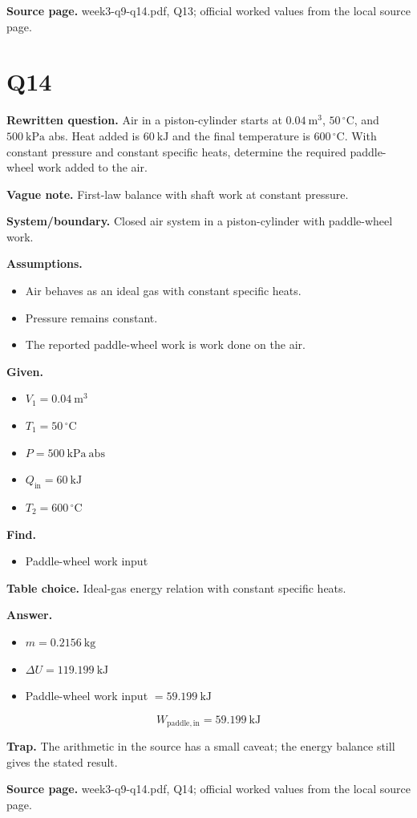 \textbf{Source page.} week3-q9-q14.pdf, Q13; official worked values from the local source page.

\section*{Q14}
\textbf{Rewritten question.} Air in a piston-cylinder starts at $0.04\ \mathrm{m^3}$, $50\,^{\circ}\mathrm{C}$, and $500\ \mathrm{kPa}$ abs. Heat added is $60\ \mathrm{kJ}$ and the final temperature is $600\,^{\circ}\mathrm{C}$. With constant pressure and constant specific heats, determine the required paddle-wheel work added to the air.

\textbf{Vague note.} First-law balance with shaft work at constant pressure.

\textbf{System/boundary.} Closed air system in a piston-cylinder with paddle-wheel work.

\textbf{Assumptions.}
\begin{itemize}
  \item Air behaves as an ideal gas with constant specific heats.
  \item Pressure remains constant.
  \item The reported paddle-wheel work is work done on the air.
\end{itemize}

\textbf{Given.}
\begin{itemize}
  \item $V_1 = 0.04\ \mathrm{m^3}$
  \item $T_1 = 50\,^{\circ}\mathrm{C}$
  \item $P = 500\ \mathrm{kPa\ abs}$
  \item $Q_{\mathrm{in}} = 60\ \mathrm{kJ}$
  \item $T_2 = 600\,^{\circ}\mathrm{C}$
\end{itemize}

\textbf{Find.}
\begin{itemize}
  \item Paddle-wheel work input
\end{itemize}

\textbf{Table choice.} Ideal-gas energy relation with constant specific heats.

\textbf{Answer.}
\begin{itemize}
  \item $m = 0.2156\ \mathrm{kg}$
  \item $\Delta U = 119.199\ \mathrm{kJ}$
  \item Paddle-wheel work input $= 59.199\ \mathrm{kJ}$
\end{itemize}

\[\boxed{W_{\mathrm{paddle,in}} = 59.199\ \mathrm{kJ}}\] 

\textbf{Trap.} The arithmetic in the source has a small caveat; the energy balance still gives the stated result.

\textbf{Source page.} week3-q9-q14.pdf, Q14; official worked values from the local source page.